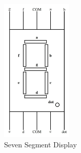 \documentclass[conference]{IEEEtran}
\begin{document}
\begin{figure}[htbp]                           
\centering                                 
\includegraphics[width=0.3\textwidth]{744703.jpg}                                           
\caption{\label{fig-2:Gates} Seven Segment Display}               
\end{figure}
\end{document}
